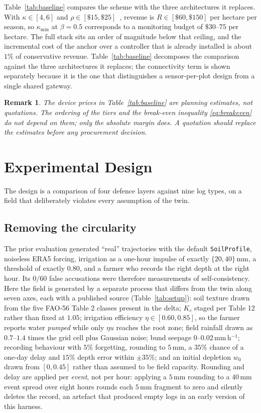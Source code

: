 \documentclass[journal]{IEEEtran}
\newtheorem{remark}{Remark}
\begin{document}
Table~\ref{tab:baseline} compares the scheme with the three architectures it
replaces. With
$\kappa\in[4,6]$ and $\rho\in[\$15,\$25]$~\cite{rmi2025rice,upstream2026price},
revenue is $R\in[\$60,\$150]$ per hectare per season, so
$\kappa_{\min}$ at $\beta=0.5$ corresponds to a monitoring budget of
$\$30$--$75$ per hectare. The full stack sits an order of magnitude below that
ceiling, and the incremental cost of the anchor over a controller that is already
installed is about $1\%$ of conservative revenue. Table~\ref{tab:baseline}
decomposes the comparison against the three architectures it replaces; the
connectivity term is shown separately because it is the one that distinguishes a
sensor-per-plot design from a single shared gateway.

\begin{remark}
The device prices in Table~\ref{tab:baseline} are planning estimates, not
quotations. The ordering of the tiers and the break-even inequality
\eqref{eq:breakeven} do not depend on them; only the absolute margin does. A
quotation should replace the estimates before any procurement decision.
\end{remark}

\section{Experimental Design}
\label{sec:design}

The design is a comparison of four defence layers against nine log types, on a
field that deliberately violates every assumption of the twin.

\subsection{Removing the circularity}

The prior evaluation generated ``real'' trajectories with the default
\texttt{SoilProfile}, noiseless ERA5 forcing, irrigation as a one-hour impulse of
exactly $\{20,40\}$\,mm, a threshold of exactly $0.80$, and a farmer who records
the right depth at the right hour. Its $0/60$ false accusations were therefore
measurements of self-consistency. Here the field is generated by a separate
process that differs from the twin along seven axes, each with a published source
(Table~\ref{tab:setup}): soil texture drawn from the five FAO-56 Table 2
classes present in the delta; $K_c$ staged per Table 12 rather than fixed at
$1.05$; irrigation efficiency $\eta\in[0.60,0.85]$, so the farmer reports water
\emph{pumped} while only $\eta u$ reaches the root zone; field rainfall drawn as
$0.7$--$1.4$ times the grid cell plus Gaussian noise; bund seepage
$0$--$0.02$\,mm\,h$^{-1}$; recording behaviour with $5\%$ forgetting, rounding to
$5$\,mm, a $35\%$ chance of a one-day delay and $15\%$ depth error within
$\pm35\%$; and an initial depletion $w_0$ drawn from $[0,0.45]$ rather than
assumed to be field capacity. Rounding and delay are applied per \emph{event},
not per hour: applying a $5$\,mm rounding to a $40$\,mm event spread over eight
hours rounds each $5$\,mm fragment to zero and silently deletes the record, an
artefact that produced empty logs in an early version of this harness.
\end{document}
